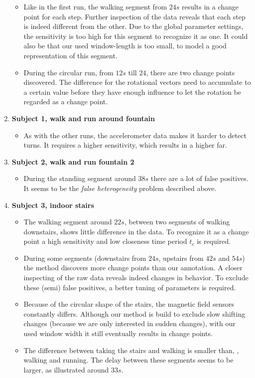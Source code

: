 \begin{enumerate}
    \begin{itemize}
      \item Like in the first run, the walking segment from $24s$ results in a change point for each step.
      Further inspection of the data reveals that each step is indeed different from the other.
      Due to the global parameter settings, the sensitivity is too high for this segment to recognize it as one.
      It could also be that our used window-length is too small, to model a good representation of this segment.
      \item During the circular run, from $12s$ till $24$, there are two change points discovered.
      The difference for the rotational vectors need to accumulate to a certain value before they have enough influence to let the rotation be regarded as a change point.

    \end{itemize}
  \item \textbf{Subject 1, walk and run around fountain} 
    \begin{itemize}
      \item As with the other runs, the accelerometer data makes it harder to detect turns.
      It requires a higher sensitivity, which results in a higher \gls{far}.
    \end{itemize}
  \item \textbf{Subject 2, walk and run fountain 2} 
    \begin{itemize}
      \item During the standing segment around $38s$ there are a lot of false positives.
      It seems to be the \emph{false heterogeneity} problem described above.
    \end{itemize}
  \item \textbf{Subject 3, indoor stairs} 
    \begin{itemize}
      \item The walking segment around $22s$, between two segments of walking downstairs, shows little difference in the data.
      To recognize it as a change point a high sensitivity and low closeness time period $t_c$ is required.
      \item During some segments (downstairs from $24s$, upstairs from $42s$ and $54s$) the method discovers more change points than our annotation.
      A closer inspecting of the raw data reveals indeed changes in behavior.
      To exclude these (semi) false positives, a better tuning of parameters is required.
      \item Because of the circular shape of the stairs, the magnetic field sensors constantly differs.
      Although our method is build to exclude slow shifting changes (because we are only interested in sudden changes), with our used window width it still eventually results in change points.
      \item The difference between taking the stairs and walking is smaller than, \eg, walking and running.
      The delay between these segments seems to be larger, as illustrated around $33s$.
    \end{itemize}
\end{enumerate}

